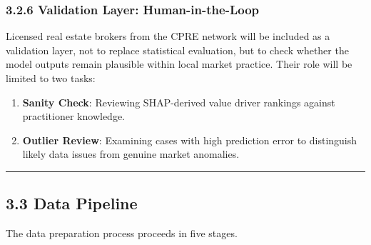 \subsubsection{\texorpdfstring{\textbf{3.2.6 Validation Layer: Human-in-the-Loop}}{3.2.6 Validation Layer: Human-in-the-Loop}}\label{validation-layer-human-in-the-loop}

Licensed real estate brokers from the CPRE network will be included as a validation layer, not to replace statistical evaluation, but to check whether the model outputs remain plausible within local market practice. Their role will be limited to two tasks:

\begin{enumerate}
\item \textbf{Sanity Check}: Reviewing SHAP-derived value driver rankings against practitioner knowledge.
\item \textbf{Outlier Review}: Examining cases with high prediction error to distinguish likely data issues from genuine market anomalies.
\end{enumerate}

\begin{center}\rule{0.5\linewidth}{0.5pt}\end{center}

\subsection{\texorpdfstring{\textbf{3.3 Data Pipeline}}{3.3 Data Pipeline}}\label{data-pipeline}

The data preparation process proceeds in five stages.

